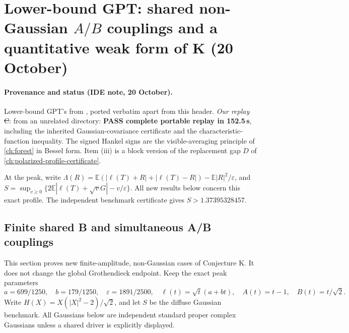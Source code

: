 \section{Lower-bound GPT: shared non-Gaussian $A/B$ couplings and a quantitative weak form of K (20 October)}
\label{ch:shared-nongaussian-new}

\paragraph{Provenance and status (IDE note, 20 October).} Lower-bound GPT's  from , ported
verbatim apart from this header. \emph{Our replay} \st{C}:  from an unrelated directory: \textbf{PASS complete portable replay in 152.5\,s}, including
the inherited Gaussian-covariance certificate and the characteristic-function inequality. The signed Hankel signs are the visible-averaging principle of \autoref{ch:forest} in
Bessel form. Item (iii) is a block version of the replacement gap $D$ of \autoref{ch:polarized-profile-certificate}.

\noindent At the peak, write $\Lambda(R)=\mathbb E(|\ell(T)+R|+|\ell(T)-R|)-\mathbb E|R|^2/\varepsilon$, and $S=\sup_{v\ge0}\{2\mathbb E|\ell(T)+\sqrt vG|-v/\varepsilon\}$. All new results below concern this exact profile. The independent benchmark certificate gives $S>1.37395328457$.\par


\subsection{Finite shared B and simultaneous A/B couplings}
\label{sec:finite-shared-ab}
This section proves new finite-amplitude, non-Gaussian cases of
Conjecture K. It does not change the global Grothendieck endpoint.
Keep the exact peak parameters
\[
 a=699/1250,\quad b=179/1250,\quad \varepsilon=1891/2500,
 \quad \ell(t)=\sqrt t(a+bt),\quad A(t)=t-1,\quad B(t)=t/\sqrt2.
\]
Write $H(X)=X(|X|^2-2)/\sqrt2$, and let $S$ be the diffuse Gaussian
benchmark. All Gaussians below are independent standard proper complex
Gaussians unless a shared driver is explicitly displayed.

